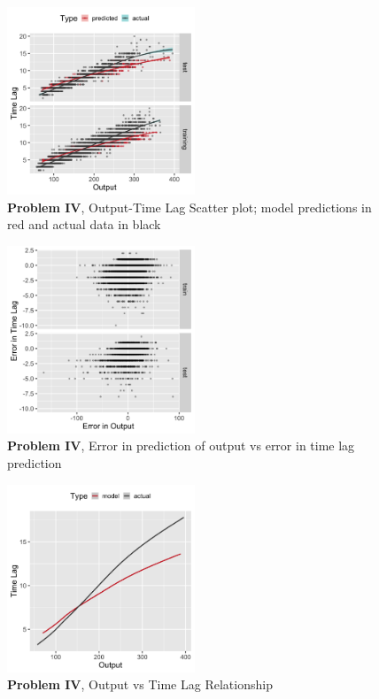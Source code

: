 \documentclass[runningheads]{llncs}
\begin{document}
\begin{figure}[h]
\vspace{.3in}
\centerline{\includegraphics[width=0.5\textwidth]{figures/exp4_scatter_v_tl.png}}
\vspace{.3in}
\caption{\textbf{Problem IV}, Output-Time Lag Scatter plot; model predictions in red and actual data in black}
\label{fig:problem4_scatter}
\end{figure}

\begin{figure}[h]
\vspace{.3in}
\centerline{\includegraphics[width=0.5\textwidth]{figures/exp4_scatter_errors.png}}
\vspace{.3in}
\caption{\textbf{Problem IV}, Error in prediction of output vs error in time lag prediction}
\label{fig:problem4_error}
\end{figure}

\begin{figure}[h]
\vspace{.3in}
\centerline{\includegraphics[width=0.5\textwidth]{figures/exp4_predictive_curves.png}}
\vspace{.3in}
\caption{\textbf{Problem IV}, Output vs Time Lag Relationship}
\label{fig:problem4_curves}
\end{figure}
\end{document}
